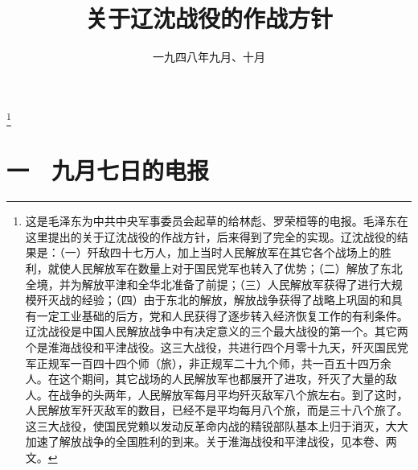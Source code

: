 
\title{关于辽沈战役的作战方针}
\date{一九四八年九月、十月}
\thanks{这是毛泽东为中共中央军事委员会起草的给林彪、罗荣桓等的电报。毛泽东在这里提出的关于辽沈战役的作战方针，后来得到了完全的实现。辽沈战役的结果是：（一）歼敌四十七万人，加上当时人民解放军在其它各个战场上的胜利，就使人民解放军在数量上对于国民党军也转入了优势；（二）解放了东北全境，并为解放平津和全华北准备了前提；（三）人民解放军获得了进行大规模歼灭战的经验；（四）由于东北的解放，解放战争获得了战略上巩固的和具有一定工业基础的后方，党和人民获得了逐步转入经济恢复工作的有利条件。辽沈战役是中国人民解放战争中有决定意义的三个最大战役的第一个。其它两个是淮海战役和平津战役。这三大战役，共进行四个月零十九天，歼灭国民党军正规军一百四十四个师（旅），非正规军二十九个师，共一百五十四万余人。在这个期间，其它战场的人民解放军也都展开了进攻，歼灭了大量的敌人。在战争的头两年，人民解放军每月平均歼灭敌军八个旅左右。到了这时，人民解放军歼灭敌军的数目，已经不是平均每月八个旅，而是三十八个旅了。这三大战役，使国民党赖以发动反革命内战的精锐部队基本上归于消灭，大大加速了解放战争的全国胜利的到来。关于淮海战役和平津战役，见本卷、两文。}
\maketitle


\section{一　九月七日的电报}

